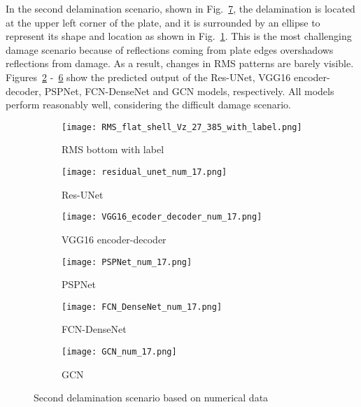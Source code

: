 \clearpage
In the second delamination scenario, shown in Fig.~\ref{fig:385_softmax}, the delamination is located at the upper left corner of the plate, and it is surrounded by an ellipse to represent its shape and location as shown in Fig.~\ref{fig:RMS_flat_shell_Vz_385}.
This is the most challenging damage scenario because of reflections coming from plate edges overshadows reflections from damage.
As a result, changes in RMS patterns are barely visible.
Figures~\ref{fig:Unet_Pred__softmax_385} -~\ref{fig:gcn_pred_385} show the predicted output of the Res-UNet, VGG16 encoder-decoder, PSPNet, FCN-DenseNet and GCN models, respectively. 
All models perform reasonably well, considering the difficult damage scenario.
\begin{figure}[!h]
	\centering
	\begin{subfigure}[b]{0.47\textwidth}
		\centering
		\texttt{[image: RMS\_flat\_shell\_Vz\_27\_385\_with\_label.png]}
		\caption{RMS bottom with label}
		\label{fig:RMS_flat_shell_Vz_385}
	\end{subfigure}
	\hfill
	\begin{subfigure}[b]{0.47\textwidth}
		\centering
		\texttt{[image: residual\_unet\_num\_17.png]}
		\caption{Res-UNet}
		\label{fig:Unet_Pred__softmax_385}
	\end{subfigure}
	\hfill
	\begin{subfigure}[b]{0.47\textwidth}
		\centering
		\texttt{[image: VGG16\_ecoder\_decoder\_num\_17.png]}
		\caption{VGG16 encoder-decoder}			\label{fig:vgg16_pred__softmax_385}			
	\end{subfigure}
	\hfill
	\begin{subfigure}[b]{0.47\textwidth}
		\centering
		\texttt{[image: PSPNet\_num\_17.png]}
		\caption{PSPNet}
		\label{fig:pspnet_pred__softmax_385}
	\end{subfigure}	
	\hfill
	\begin{subfigure}[b]{0.47\textwidth}
		\centering
		\texttt{[image: FCN\_DenseNet\_num\_17.png]}
		\caption{FCN-DenseNet}
		\label{fig:fcn_densenet_pred__softmax_385}
	\end{subfigure}	
	\hfill
	\begin{subfigure}[b]{0.47\textwidth}
		\centering
		\texttt{[image: GCN\_num\_17.png]}
		\caption{GCN}
		\label{fig:gcn_pred_385}
	\end{subfigure}
	\caption{Second delamination scenario based on numerical data}
	\label{fig:385_softmax}
\end{figure}
